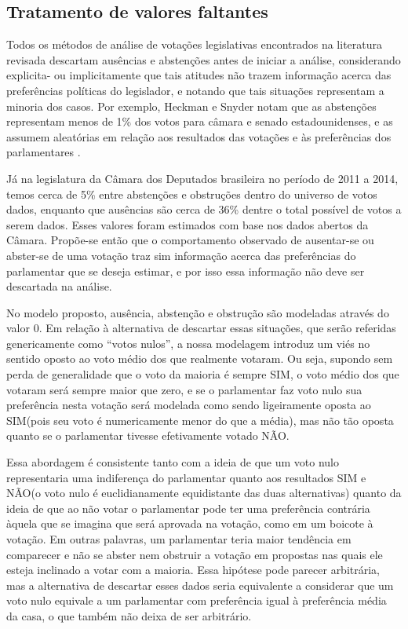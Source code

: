 \documentclass[
	article,			%
	12pt,				%
	oneside,			%
	a4paper,			%
	english,			%
	brazil,				%
	sumario=tradicional,
	oldfontcommands %
	]{abntex2}
\newcommand\nay{NÃO\xspace}
\newcommand\yea{SIM\xspace}
\begin{document}
\subsection{Tratamento de valores faltantes}

Todos os métodos de análise de votações legislativas encontrados na literatura revisada descartam ausências e abstenções antes de iniciar a análise, considerando explicita- ou implicitamente que tais atitudes não trazem informação acerca das preferências políticas do legislador, e notando que tais situações representam a minoria dos casos. Por exemplo, Heckman e Snyder notam que as abstenções representam menos de 1\% dos votos para câmara e senado estadounidenses, e as assumem aleatórias em relação aos resultados das votações e às preferências dos parlamentares \cite{heckman-snyder1997}.

Já na legislatura da Câmara dos Deputados brasileira no período de 2011 a 2014, temos cerca de 5\% entre abstenções e obstruções dentro do universo de votos dados, enquanto que ausências são cerca de 36\% dentre o total possível de votos a serem dados. Esses valores foram estimados com base nos dados abertos da Câmara. Propõe-se então que o comportamento observado de ausentar-se ou abster-se de uma votação traz sim informação acerca das preferências do parlamentar que se deseja estimar, e por isso essa informação não deve ser descartada na análise.

No modelo proposto, ausência, abstenção e obstrução são modeladas através do valor 0. Em relação à alternativa de descartar essas situações, que serão referidas genericamente como ``votos nulos'', a nossa modelagem introduz um viés no sentido oposto ao voto médio dos que realmente votaram. Ou seja, supondo sem perda de generalidade que o voto da maioria é sempre \yea, o voto médio dos que votaram será sempre maior que zero, e se o parlamentar faz voto nulo sua preferência nesta votação será modelada como sendo ligeiramente oposta ao \yea (pois seu voto é numericamente menor do que a média), mas não tão oposta quanto se o parlamentar tivesse efetivamente votado \nay.

Essa abordagem é consistente tanto com a ideia de que um voto nulo representaria uma indiferença do parlamentar quanto aos resultados \yea e \nay (o voto nulo é euclidianamente equidistante das duas alternativas) quanto da ideia de que ao não votar o parlamentar pode ter uma preferência contrária àquela que se imagina que será aprovada na votação, como em um boicote à votação. Em outras palavras, um parlamentar teria maior tendência em comparecer e não se abster nem obstruir a votação em propostas nas quais ele esteja inclinado a votar com a maioria. Essa hipótese pode parecer arbitrária, mas a alternativa de descartar esses dados seria equivalente a considerar que um voto nulo equivale a um parlamentar com preferência igual à preferência média da casa, o que também não deixa de ser arbitrário.
\end{document}
